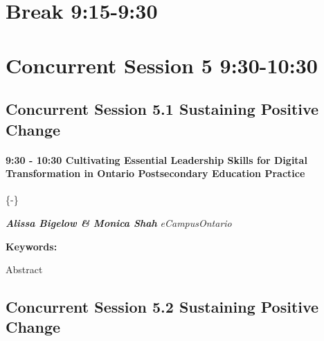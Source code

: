 \documentclass[
]{book}
\begin{document}
\hypertarget{break-915-930}{%
\section*{Break \textbar{} 9:15-9:30}\label{break-915-930}}

\hypertarget{concurrent-session-5-930-1030}{%
\section*{Concurrent Session 5 \textbar{} 9:30-10:30}\label{concurrent-session-5-930-1030}}

\hypertarget{concurrent-session-5.1-sustaining-positive-change}{%
\subsection*{Concurrent Session 5.1 \textbar{} Sustaining Positive Change}\label{concurrent-session-5.1-sustaining-positive-change}}

\begin{session}
\hypertarget{cultivating-essential-leadership-skills-for-digital-transformation-in-ontario-postsecondary-education-practice}{%
\paragraph{\texorpdfstring{9:30 - 10:30 \textbar{} \textbf{Cultivating
Essential Leadership Skills for Digital Transformation in Ontario
Postsecondary Education} \textbar{}
Practice}{9:30 - 10:30 \textbar{} Cultivating Essential Leadership Skills for Digital Transformation in Ontario Postsecondary Education \textbar{} Practice}}\label{cultivating-essential-leadership-skills-for-digital-transformation-in-ontario-postsecondary-education-practice}}

\{-\}

\textbf{\emph{Alissa Bigelow \& Monica Shah}} \textbar{}
\emph{eCampusOntario}

\textbf{Keywords:}

Abstract
\end{session}

\hypertarget{concurrent-session-5.2-sustaining-positive-change}{%
\subsection*{Concurrent Session 5.2 \textbar{} Sustaining Positive Change}\label{concurrent-session-5.2-sustaining-positive-change}}
\end{document}
